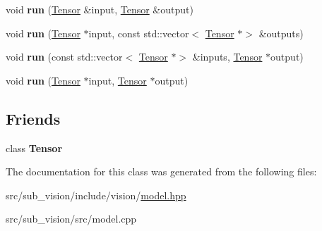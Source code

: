 \begin{DoxyCompactItemize}
\mbox{\label{classModel_a08e092b7c812a612d9ebeec7e53ffc8c}} 
void {\bfseries run} (\hyperlink{classTensor}{Tensor} \&input, \hyperlink{classTensor}{Tensor} \&output)
\item 
\mbox{\label{classModel_a27b77b2f792d42335b1144fc8052b5f6}} 
void {\bfseries run} (\hyperlink{classTensor}{Tensor} $\ast$input, const std\+::vector$<$ \hyperlink{classTensor}{Tensor} $\ast$$>$ \&outputs)
\item 
\mbox{\label{classModel_a3820410a91fcdc42f0b95ac530bbe076}} 
void {\bfseries run} (const std\+::vector$<$ \hyperlink{classTensor}{Tensor} $\ast$$>$ \&inputs, \hyperlink{classTensor}{Tensor} $\ast$output)
\item 
\mbox{\label{classModel_a69adac2817988199c16f5e76cb5e9ce3}} 
void {\bfseries run} (\hyperlink{classTensor}{Tensor} $\ast$input, \hyperlink{classTensor}{Tensor} $\ast$output)
\end{DoxyCompactItemize}
\subsection*{Friends}
\begin{DoxyCompactItemize}
\item 
\mbox{\label{classModel_a1663dd13ae2030687b72f6c5506bd033}} 
class {\bfseries Tensor}
\end{DoxyCompactItemize}


The documentation for this class was generated from the following files\+:\begin{DoxyCompactItemize}
\item 
src/sub\+\_\+vision/include/vision/\hyperlink{model_8hpp}{model.\+hpp}\item 
src/sub\+\_\+vision/src/model.\+cpp\end{DoxyCompactItemize}
